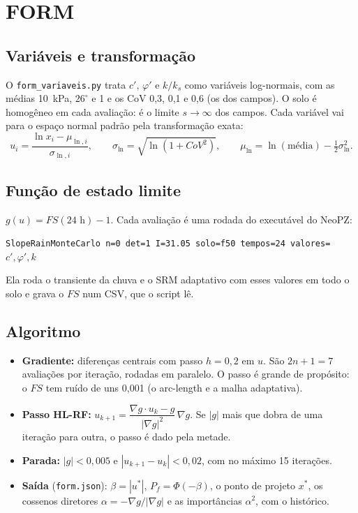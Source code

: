 \documentclass[11pt,a4paper]{article}
\begin{document}
\section{FORM}
\subsection{Variáveis e transformação}
O \texttt{form\_variaveis.py} trata $c'$, $\varphi'$ e $k/k_s$ como variáveis log-normais, com as médias 10~kPa, $26^\circ$
e 1 e os CoV 0,3, 0,1 e 0,6 (os dos campos). O solo é homogêneo em cada avaliação: é o limite $s \to \infty$ dos
campos. Cada variável vai para o espaço normal padrão pela transformação exata:
\[
u_i = \frac{\ln x_i - \mu_{\ln,i}}{\sigma_{\ln,i}}, \qquad \sigma_{\ln} = \sqrt{\ln(1 + CoV^2)}, \qquad
\mu_{\ln} = \ln(\text{média}) - \tfrac12 \sigma_{\ln}^2 .
\]

\subsection{Função de estado limite}
$g(u) = FS(24\text{ h}) - 1$. Cada avaliação é uma rodada do executável do NeoPZ:
\begin{center}
\texttt{SlopeRainMonteCarlo n=0 det=1 I=31.05 solo=f50 tempos=24 valores=}$c',\varphi',k$
\end{center}
Ela roda o transiente da chuva e o SRM adaptativo com esses valores em todo o solo e grava o $FS$ num CSV, que o
script lê.

\subsection{Algoritmo}
\begin{itemize}
\item \textbf{Gradiente:} diferenças centrais com passo $h = 0{,}2$ em $u$. São $2n + 1 = 7$ avaliações por iteração,
rodadas em paralelo. O passo é grande de propósito: o $FS$ tem ruído de uns 0,001 (o arc-length e a malha adaptativa).
\item \textbf{Passo HL-RF:} $u_{k+1} = \dfrac{\nabla g \cdot u_k - g}{|\nabla g|^2}\, \nabla g$. Se $|g|$ mais que
dobra de uma iteração para outra, o passo é dado pela metade.
\item \textbf{Parada:} $|g| < 0{,}005$ e $|u_{k+1} - u_k| < 0{,}02$, com no máximo 15 iterações.
\item \textbf{Saída} (\texttt{form.json}): $\beta = |u^*|$, $P_f = \Phi(-\beta)$, o ponto de projeto $x^*$, os cossenos
diretores $\alpha = -\nabla g/|\nabla g|$ e as importâncias $\alpha^2$, com o histórico.
\end{itemize}
\end{document}
